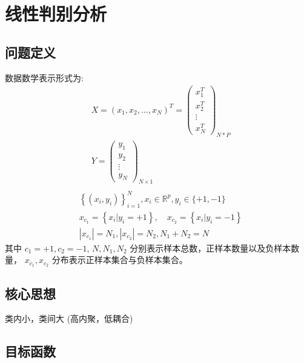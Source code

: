\documentclass[11pt]{article}
\author{hyliu}
\date{\today}
\title{}
\begin{document}
\tableofcontents

\section{线性判别分析}
\label{sec:org65a9e05}
\subsection{问题定义}
\label{sec:orgcad4e4f}
数据数学表示形式为:
\begin{equation}
\label{eq:1}
\begin{align}
&X = \left( x_1, x_2,...,x_{N} \right)^T = \left (
\begin{array}{c}
x_{1}^T \\
x_2^T \\
\vdots \\
x_N^T 
\end{array}
\right )_{N*P}\\
&Y=\left(\begin{array}{l}y_{1} \\ y_{2} \\ \vdots \\ y_{N}\end{array}\right)_{N \times 1}\\
\end{align}
\end{equation}
\begin{equation}
\label{eq:3}
\begin{align}
&\left\{\left(x_{i}, y_{i}\right)\right\}_{i=1}^{N}, x_{i} \in \mathbb{R}^{p}, y_{i} \in\{+1,-1\}\\
&x_{c_1}=\left\{x_{i} | y_{i}=+1\right\}, \quad x_{c_{2}}=\left\{x_{i} | y_{i}=-1\right\}\\
&\left| x_{c_1} \right| = N_1, \left| x_{c_2} \right| = N_2, N_1 + N_2 = N
\end{align}
\end{equation}
其中 \(c_1 = +1, c_2 = -1\), \(N, N_1, N_2\) 分别表示样本总数，正样本数量以及负样本数量， \(x_{c_1}, x_{c_2}\) 分布表示正样本集合与负样本集合。
\subsection{核心思想}
\label{sec:org0419d5a}
类内小，类间大 (高内聚，低耦合)
\subsection{目标函数}
\label{sec:orgc4ec09c}
\end{document}
